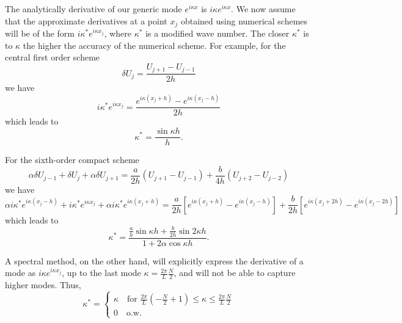 \documentclass[oneside,a4paper,11pt]{report}
\begin{document}
The analytically derivative of our generic mode $e^{i\kappa x}$ is $i\kappa e^{i\kappa x}$. We now assume that the approximate derivatives at a point $x_j$ obtained using numerical schemes will be of the form $i\kappa^* e^{i\kappa x_j}$, where $\kappa^*$ is a modified wave number. The closer $\kappa^*$ is to $\kappa$ the higher the accuracy of the numerical scheme. For example, for the central first order scheme 
\begin{equation}
\delta U_j = \frac{ U_{j+1} - U_{j-1} }{ 2h }
\end{equation}
we have
\begin{equation}
    i\kappa^*e^{i\kappa x_j} = \frac{ e^{i\kappa (x_j+h) } - e^{ i \kappa (x_j-h)  } }{2h}
\end{equation}
which leads to
\begin{equation}
    \kappa^* = \frac{ \sin \kappa h }{h}.
\end{equation}

For the sixth-order compact scheme
\begin{equation}
    \alpha \delta U_{j-1} + \delta U_j + \alpha \delta U_{j+1} = \frac{a}{2h} \left( U_{j+1} - U_{j-1} \right) + \frac{b}{4h} \left ( U_{j+2} - U_{j-2} \right)
\end{equation}
we have
\begin{equation}
    \alpha i \kappa^* e^{i \kappa (x_j -h) } + i\kappa^* e^{i \kappa x_j} + \alpha i \kappa^* e^{i \kappa (x_j + h)} = \frac{a}{2h} \left [ e^{i \kappa (x_j+h) } - e^{ i \kappa (x_j-h) } \right ] + \frac{b}{2h} \left [ e^{i \kappa (x_j+2h) } - e^{ i \kappa (x_j-2h) } \right ]
\end{equation}
which leads to
\begin{equation}
    \kappa^* = \frac{ \frac{a}{h} \sin \kappa h + \frac{b}{2h} \sin 2\kappa h}{1 + 2\alpha \cos \kappa h}.
\end{equation}

A spectral method, on the other hand, will explicitly express the derivative of a mode as $i \kappa e^{i \kappa x_j}$, up to the last mode $\kappa = \frac{2 \pi}{L} \frac{N}{2}$, and will not be able to capture higher modes. Thus,
\begin{equation}
    \kappa^* = \begin{cases} \kappa \quad \text{for } \frac{2 \pi}{L} \left (-\frac{N}{2} +1 \right ) \le \kappa \le \frac{2 \pi}{L} \frac{N}{2} \\ 0 \quad \text{o.w.} \end{cases}
\end{equation}
\end{document}
